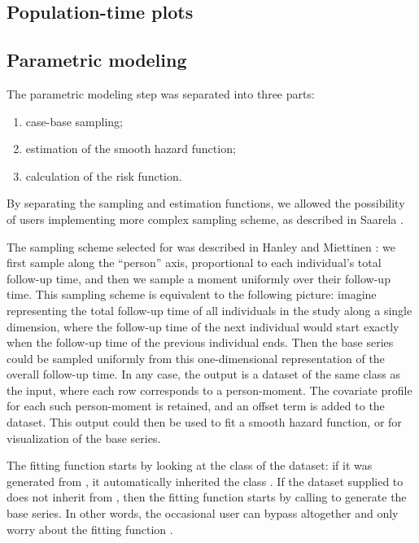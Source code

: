 \documentclass[
]{jss}
\providecommand{\tightlist}{%
  \setlength{\itemsep}{0pt}\setlength{\parskip}{0pt}}
\begin{document}
\hypertarget{population-time-plots}{%
\subsection{Population-time plots}\label{population-time-plots}}

\hypertarget{parametric-modeling}{%
\subsection{Parametric modeling}\label{parametric-modeling}}

The parametric modeling step was separated into three parts:

\begin{enumerate}
\def\labelenumi{\arabic{enumi}.}
\tightlist
\item
  case-base sampling;
\item
  estimation of the smooth hazard function;
\item
  calculation of the risk function.
\end{enumerate}

By separating the sampling and estimation functions, we allowed the
possibility of users implementing more complex sampling scheme, as
described in Saarela \citeyearpar{saarela2016case}.

The sampling scheme selected for  was described in
Hanley and Miettinen \citeyearpar{hanley2009fitting}: we first sample
along the ``person'' axis, proportional to each individual's total
follow-up time, and then we sample a moment uniformly over their
follow-up time. This sampling scheme is equivalent to the following
picture: imagine representing the total follow-up time of all
individuals in the study along a single dimension, where the follow-up
time of the next individual would start exactly when the follow-up time
of the previous individual ends. Then the base series could be sampled
uniformly from this one-dimensional representation of the overall
follow-up time. In any case, the output is a dataset of the same class
as the input, where each row corresponds to a person-moment. The
covariate profile for each such person-moment is retained, and an offset
term is added to the dataset. This output could then be used to fit a
smooth hazard function, or for visualization of the base series.

The fitting function  starts by looking at the
class of the dataset: if it was generated from , it
automatically inherited the class . If the dataset supplied
to  does not inherit from , then the
fitting function starts by calling  to generate the
base series. In other words, the occasional user can bypass
 altogether and only worry about the fitting
function .
\end{document}
